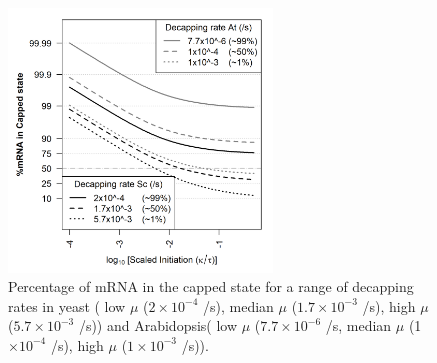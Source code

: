 \documentclass[a4,center,fleqn]{NAR}
\begin{document}


\begin{figure}[!ht]
\begin{center}
\includegraphics[width=70mm]{Images/2023-07-28_logodds.png}
\caption{Percentage of mRNA in the capped state for a range of decapping rates in yeast ( low $\mu$ ($2\times 10^{-4}$ /s), median $\mu$ ($1.7\times 10^{-3}$ /s), high $\mu$ ($5.7\times 10^{-3}$ /s)) and Arabidopsis( low $\mu$ ($7.7\times 10^{-6}$ /s, median $\mu$ (1$\times 10^{-4}$ /s), high $\mu$ ($1\times 10^{-3}$ /s)). }
\end{center}
\end{figure}
\end{document}
